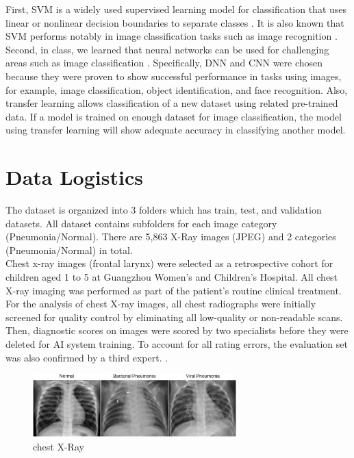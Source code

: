 \documentclass{article}
\begin{document}
First, SVM is a widely used supervised learning model for classification that uses linear or nonlinear decision boundaries to separate classes \cite{KUMARBOOK}. It is also known that SVM performs notably in image classification tasks such as image recognition \cite{ROBUST}. Second, in class, we learned that neural networks can be used for challenging areas such as image classification \cite{KUMARBOOK}. Specifically, DNN and CNN were chosen because they were proven to show successful performance in tasks using images, for example,  image classification, object identification, and face recognition. Also, transfer learning allows classification of a new dataset using related pre-trained data. If a model is trained on enough dataset for image classification, the model using transfer learning will show adequate accuracy in classifying another model.

\section {Data Logistics}
The dataset is organized into 3 folders which has train, test, and validation datasets. All dataset contains subfolders for each image category (Pneumonia/Normal). There are 5,863 X-Ray images (JPEG) and 2 categories (Pneumonia/Normal) in total.\\
Chest x-ray images (frontal larynx) were selected as a retrospective cohort for children aged 1 to 5 at Guangzhou Women's and Children's Hospital. All chest X-ray imaging was performed as part of the patient's routine clinical treatment.\\
For the analysis of chest X-ray images, all chest radiographs were initially screened for quality control by eliminating all low-quality or non-readable scans. Then, diagnostic scores on images were scored by two specialists before they were deleted for AI system training. To account for all rating errors, the evaluation set was also confirmed by a third expert.
\cite{PNEUMONIA_IMAGE}. 
    \begin{figure}[H]
        \centering
    \includegraphics[width=0.7\textwidth]{figures/Pneumonia.jpg}
    \caption{chest X-Ray}
    \end{figure}
    
\end{document}
